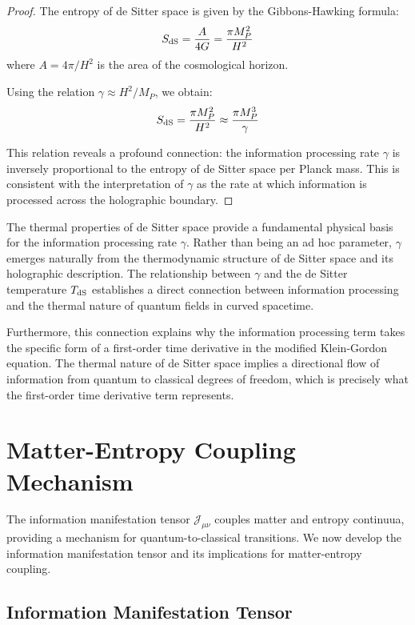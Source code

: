 \documentclass[11pt,english,twoside]{article}
\theoremstyle{plain}
\theoremstyle{definition}
\theoremstyle{remark}
\newcommand{\dS}{{\rm dS}}
\newcommand{\J}{{\mathcal{J}}}
\newcommand{\gammaR}{\gamma}
\begin{document}
\begin{proof}
The entropy of de Sitter space is given by the Gibbons-Hawking formula:
\begin{equation}
S_{\dS} = \frac{A}{4G} = \frac{\pi M_P^2}{H^2}
\end{equation}
where $A = 4\pi/H^2$ is the area of the cosmological horizon.

Using the relation $\gammaR \approx H^2/M_P$, we obtain:
\begin{equation}
S_{\dS} = \frac{\pi M_P^2}{H^2} \approx \frac{\pi M_P^3}{\gammaR}
\end{equation}

This relation reveals a profound connection: the information processing rate $\gammaR$ is inversely proportional to the entropy of de Sitter space per Planck mass. This is consistent with the interpretation of $\gammaR$ as the rate at which information is processed across the holographic boundary.
\end{proof}

The thermal properties of de Sitter space provide a fundamental physical basis for the information processing rate $\gammaR$. Rather than being an ad hoc parameter, $\gammaR$ emerges naturally from the thermodynamic structure of de Sitter space and its holographic description. The relationship between $\gammaR$ and the de Sitter temperature $T_{\dS}$ establishes a direct connection between information processing and the thermal nature of quantum fields in curved spacetime.

Furthermore, this connection explains why the information processing term takes the specific form of a first-order time derivative in the modified Klein-Gordon equation. The thermal nature of de Sitter space implies a directional flow of information from quantum to classical degrees of freedom, which is precisely what the first-order time derivative term represents.

\section{Matter-Entropy Coupling Mechanism}
\label{sec:matter_entropy}

The information manifestation tensor $\J_{\mu\nu}$ couples matter and entropy continuua, providing a mechanism for quantum-to-classical transitions. We now develop the information manifestation tensor and its implications for matter-entropy coupling.

\subsection{Information Manifestation Tensor}
\label{subsec:info_current}
\end{document}
